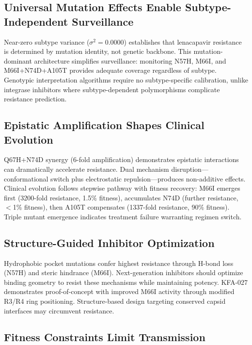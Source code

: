 \documentclass[twocolumn]{article}
\begin{document}
\subsection{Universal Mutation Effects Enable Subtype-Independent Surveillance}

Near-zero subtype variance ($\sigma^2=0.0000$) establishes that lenacapavir resistance is determined by mutation identity, not genetic backbone. This mutation-dominant architecture simplifies surveillance: monitoring N57H, M66I, and M66I+N74D+A105T provides adequate coverage regardless of subtype. Genotypic interpretation algorithms require no subtype-specific calibration, unlike integrase inhibitors where subtype-dependent polymorphisms complicate resistance prediction\cite{Rhee2016}.

\subsection{Epistatic Amplification Shapes Clinical Evolution}

Q67H+N74D synergy (6-fold amplification) demonstrates epistatic interactions can dramatically accelerate resistance. Dual mechanism disruption—conformational switch plus electrostatic repulsion—produces non-additive effects. Clinical evolution follows stepwise pathway with fitness recovery: M66I emerges first (3200-fold resistance, 1.5\% fitness), accumulates N74D (further resistance, $<$1\% fitness), then A105T compensates (1337-fold resistance, 90\% fitness). Triple mutant emergence indicates treatment failure warranting regimen switch.

\subsection{Structure-Guided Inhibitor Optimization}

Hydrophobic pocket mutations confer highest resistance through H-bond loss (N57H) and steric hindrance (M66I). Next-generation inhibitors should optimize binding geometry to resist these mechanisms while maintaining potency. KFA-027 demonstrates proof-of-concept with improved M66I activity through modified R3/R4 ring positioning\cite{Yant2022}. Structure-based design targeting conserved capsid interfaces may circumvent resistance.

\subsection{Fitness Constraints Limit Transmission}
\end{document}
